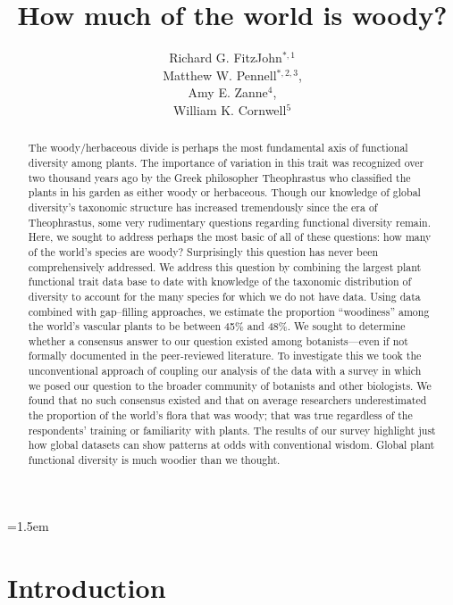 \documentclass[12pt]{article}
\title{How much of the world is woody?}
\author{
Richard G. FitzJohn$^{*,1}$\\ Matthew W. Pennell$^{*,2,3}$,\\ Amy E. Zanne$^{4}$,\\ William K. Cornwell$^{5}$
}
\date{}
\affiliation{\noindent
$^*$ These authors contributed equally}
\begin{document}
\mstitlepage
\parindent=1.5em
\addtolength{\parskip}{.3em}

\begin{abstract}
The woody/herbaceous divide is perhaps the most fundamental axis of functional diversity among plants. The importance of variation in this trait was recognized over two thousand years ago by the Greek philosopher Theophrastus who classified the plants in his garden as either woody or herbaceous. Though our knowledge of global diversity's taxonomic structure  has increased tremendously since the era of Theophrastus, some very rudimentary questions regarding functional diversity remain. Here, we sought to address perhaps the most basic of all of these questions: how many of the world's species are woody? Surprisingly this question has never been comprehensively addressed.  We address this question by combining the largest plant functional trait data base to date with knowledge of the taxonomic distribution of diversity to account for the many species for which we do not have data. Using data combined with gap--filling approaches, we estimate the proportion ``woodiness'' among the world's vascular plants to be between 45\% and 48\%.  We sought to determine whether a consensus answer to our question existed among botanists---even if not formally documented in the peer-reviewed literature. To investigate this we took the unconventional approach of coupling our analysis of the data with a survey in which we posed our question to the broader community of botanists and other biologists.  We found that no such consensus existed and that on average researchers underestimated the proportion of the world's flora that was woody; that was true regardless of the respondents' training or familiarity with plants. The results of our survey highlight just how global datasets can show patterns at odds with conventional wisdom.  Global plant functional diversity is much woodier than we thought.  
\end{abstract}

\section{Introduction}
\end{document}
